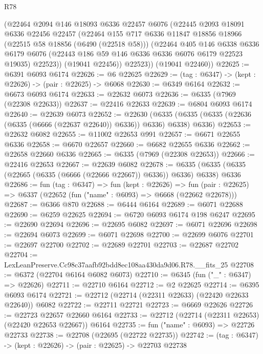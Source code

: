 \begin{lexlean}{R78}
\begin{coremodule}
        (@22464
          @2094
          @146
          @18093
          @6336
          @22457
          @6076
          (@22445
            @2093
            @18091
            @6336
            @22456
            @22457
            (@22464
              @155
              @717
              @6336
              @11847
              @18856
              @18966
              (@22515 @58 @18856 (@6490 (@22518 @58)))
              (@22464
                @405
                @146
                @6338
                @6336
                @6179
                @6076
                (@22443 @186 @59 @146 @6336 @6336 @6076 @6179 @22523 @19035)
                @22523))
            (@19041 @22456))
          @22523))
      (@19041 @22460))
@22625 := @6391 @6093 @6174
@22626 := @6 @22625
@22629 := (tag : @6347) -> (kept : @22626) -> (pair : @22625) -> @6068
@22630 := @6349 @6164
@22632 := @6673 @6093 @6174
@22633 := @22632 @6073
@22636 := @6335 (@7969 (@22308 @22633))
@22637 := @22416 @22633
@22639 := @6804 @6093 @6174
@22640 := @22639 @6073
@22652 := @22630
    (@6335 (@6335 (@6335 (@22636 (@6335 (@6666 (@22637 @22640)) @6336)) @6336) @6338) @6336)
@22653 := @22632 @6082
@22655 := @11002 @22653 @991
@22657 := @6671 @22655 @6336
@22658 := @6670 @22657
@22660 := @6682 @22655 @6336
@22662 := @22658 @22660 @6336
@22665 := @6335 (@7969 (@22308 @22653))
@22666 := @22416 @22653
@22667 := @22639 @6082
@22678 := @6335 (@6335 (@6335 (@22665 (@6335 (@6666 (@22666 @22667)) @6336)) @6336) @6338) @6336
@22686 := fun (tag : @6347) =>
  fun (kept : @22626) =>
  fun (pair : @22625) => @6337 (@22652 (fun ("name" : @6093) => @6668 (@22662 @22678)))
@22687 := @6366 @870
@22688 := @6444 @6164
@22689 := @6071 @22688
@22690 := @6259 @22625
@22694 := @6720 @6093 @6174 @198 @6247
@22695 := @22690 @22694
@22696 := @22695 @6082
@22697 := @6071 @22696
@22698 := @22694 @6073
@22699 := @6071 @22698
@22700 := @22699 @6076
@22701 := @22697 @22700
@22702 := @22689 @22701
@22703 := @22687 @22702
@22704 := LexLeanPreserve.Cc98c37aafb92bdd8ec108aa430da9d06.R78.__fits_25
@22708 := @6372 (@22704 @6164 @6082 @6073)
@22710 := @6345 (fun ("_" : @6347) => @22626)
@22711 := @22710 @6164
@22712 := @2 @22625
@22714 := @6395 @6093 @6174
@22721 := @22712 (@22714 (@22311 @22633) (@22420 @22633 @22640)) @6082
@22722 := @22711 @22721
@22723 := @6669 @22626
@22726 := @22723 @22657 @22660 @6164
@22733 := @22712 (@22714 (@22311 @22653) (@22420 @22653 @22667)) @6164
@22735 := fun ("name" : @6093) => @22726 @22733
@22738 := @22708 (@22695 (@22722 @22735))
@22742 := (tag : @6347) -> (kept : @22626) -> (pair : @22625) -> @22703 @22738

\end{coremodule}
\end{lexlean}
